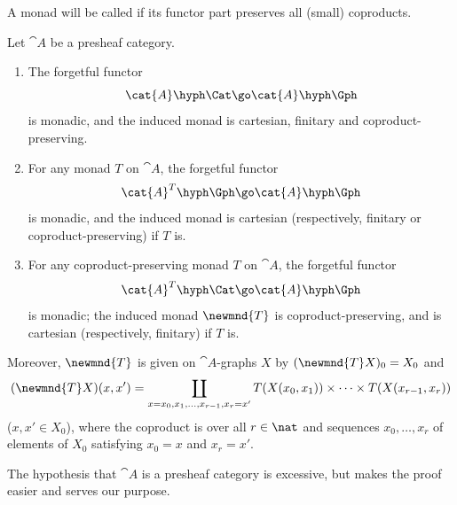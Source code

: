 A monad will be called %
%
%
%
%
%
if its functor part
preserves all (small) coproducts.

\begin{propn}	
Let $\cat{A}$ be a presheaf category.
%
\begin{enumerate}
\item	{}
The forgetful functor 
\[
\cat{A}\hyph\Cat \go \cat{A}\hyph\Gph
\]
is monadic, and the induced monad is cartesian, finitary and
coproduct-preserving.
\item	{}
For any monad $T$ on $\cat{A}$, the forgetful functor 
\[
\cat{A}^T\hyph\Gph \go \cat{A}\hyph\Gph
\]
is monadic, and the induced monad is cartesian (respectively, finitary or
coproduct-preserving) if $T$ is.
\item	{}
For any coproduct-preserving monad $T$ on $\cat{A}$, the forgetful functor 
\[
\cat{A}^T\hyph\Cat \go \cat{A}\hyph\Gph
\]
is monadic; the induced monad $\newmnd{T}$ is coproduct-preserving, and is
cartesian (respectively, finitary) if $T$ is.
\end{enumerate}
%
Moreover, $\newmnd{T}$ 
is given on $\cat{A}$-graphs $X$ by $(\newmnd{T}X)_0 = X_0$ and
\[
(\newmnd{T}X)(x,x') 
=
\coprod_{x=x_0, x_1, \ldots, x_{r-1}, x_r=x'}
T(X(x_0, x_1)) \times\cdots\times T(X(x_{r-1},x_r))
\]
($x,x' \in X_0$), where the coproduct is over all $r\in\nat$ and sequences
$x_0, \ldots, x_r$ of elements of $X_0$ satisfying $x_0 = x$ and $x_r =
x'$.
\end{propn}
%
The hypothesis that $\cat{A}$ is a presheaf category is excessive, but
makes the proof easier and serves our purpose.
%
